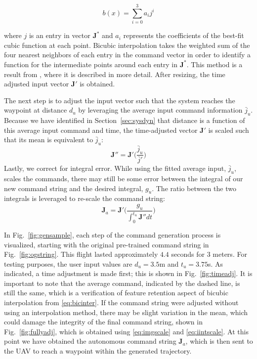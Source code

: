 \documentclass[letterpaper, 10 pt, conference]{ieeeconf}  %
\newcommand\NB[1]{$\spadesuit$\footnote{NB: #1}}
\begin{document}
\begin{equation} \label{eq:bicinter}
    b(x) = \sum_{i=0}^3a_ij^i
\end{equation}

where $j$ is an entry in vector $\bm{J}^*$ and $a_i$ represents the coefficients of the best-fit cubic function at each point. %
Bicubic interpolation takes the weighted sum of the four nearest neighbors of each entry in the command vector in order to identify a function for the intermediate points around each entry in $\bm{J}^*$. This method is a result from \cite{bicfeatures}, where it is described in more detail. After resizing, the time adjusted input vector $\bm{J}'$ is obtained.

The next step is to adjust the input vector such that the system reaches the waypoint at distance $d_u$ by leveraging the average input command information $\bar{j}_u$. Because we have identified in Section~\ref{sec:sysdyn} that distance is a function of this average input command and time, the time-adjusted vector $\bm{J}'$ is scaled such that its mean is equivalent to $\bar{j}_u$:
\begin{equation} \label{eq:imgscale}
\bm{J}'' = \bm{J}'\bigg(\frac{\bar{j}_u}{\bar{j}'}\bigg)
\end{equation}
Lastly, we correct for integral error. While using the fitted average input, $\bar{j}_u$, scales the commands, there may still be some error between the integral of our new command string and the desired integral, $g_u$. The ratio between the two integrals is leveraged to re-scale the command string:
\begin{equation} \label{eq:iintscale}
\bm{J}_a = \bm{J}'\bigg(\frac{g_u}{\int_0^{t_u}\bm{J}''dt}\bigg)
\end{equation}


In Fig.~\ref{fig:gensample}, each step of the command generation process is visualized, starting with the original pre-trained command string in Fig.~\ref{fig:ogstring}. This flight lasted approximately $4.4$ seconds for $3$ meters. For testing purposes, the user input values are $d_u=3.5$m and $t_u=3.75$s. As indicated, a time adjustment is made first; this is shown in Fig.~\ref{fig:timeadj}. It is important to note that the average command, indicated by the dashed line, is still the same, which is a verification of feature retention aspect of bicubic interpolation from \eqref{eq:bicinter}. If the command string were adjusted without using an interpolation method, there may be slight variation in the mean, which could damage the integrity of the final command string, shown in Fig.~\ref{fig:fullyadj}, which is obtained using \eqref{eq:imgscale} and \eqref{eq:iintscale}. At this point we have obtained the autonomous command string $\bm{J}_a$, which is then sent to the UAV to reach a waypoint within the generated trajectory.
\end{document}
